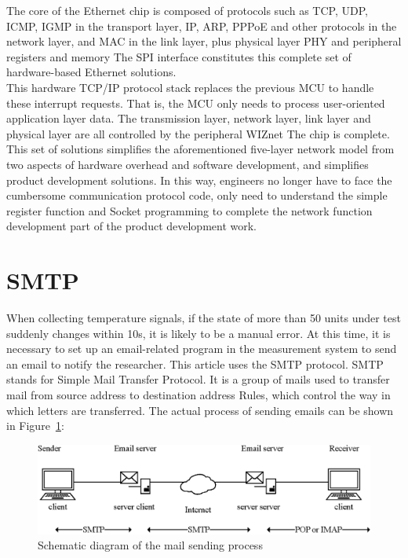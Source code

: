 \FloatBarrier
The core of the Ethernet chip is composed of protocols such as TCP, UDP, ICMP, IGMP in the transport layer, IP, ARP, PPPoE and other protocols in the network layer, and MAC in the link layer, plus physical layer PHY and peripheral registers and memory The SPI interface constitutes this complete set of hardware-based Ethernet solutions.
\\
This hardware TCP/IP protocol stack replaces the previous MCU to handle these interrupt requests. That is, the MCU only needs to process user-oriented application layer data. The transmission layer, network layer, link layer and physical layer are all controlled by the peripheral WIZnet The chip is complete. This set of solutions simplifies the aforementioned five-layer network model from two aspects of hardware overhead and software development, and simplifies product development solutions. In this way, engineers no longer have to face the cumbersome communication protocol code, only need to understand the simple register function and Socket programming to complete the network function development part of the product development work.

\section{SMTP}
\label{sec:SMTP}
When collecting temperature signals, if the state of more than 50 units under test suddenly changes within 10s, it is likely to be a manual error. At this time, it is necessary to set up an email-related program in the measurement system to send an email to notify the researcher. This article uses the SMTP protocol.
SMTP stands for Simple Mail Transfer Protocol. It is a group of mails used to transfer mail from source address to destination address
Rules, which control the way in which letters are transferred. The actual process of sending emails can be shown in Figure~\ref{fig:2.10}:
 
\begin{figure}[!ht]
	\centering
	\includegraphics[width=15cm]{grafiken/2.10.eps}
	\caption{Schematic diagram of the mail sending process} 
	\label{fig:2.10}
\end{figure}
\FloatBarrier

